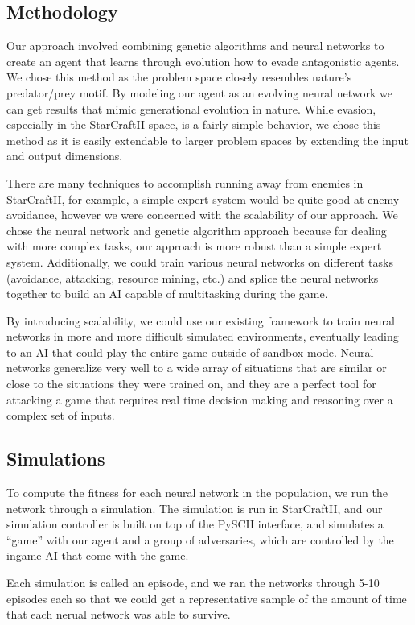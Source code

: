\documentclass{article}
\begin{document}
\begin{multicols}{2}
\section{Methodology}
Our approach involved combining genetic algorithms and neural networks to
create an agent that learns through evolution how to evade antagonistic
agents. We chose this method as the problem space closely resembles nature's
predator/prey motif. By modeling our agent as an evolving neural network we can
get results that mimic generational evolution in nature. While evasion,
especially in the StarCraftII space, is a fairly simple behavior, we chose this
method as it is easily extendable to larger problem spaces by extending the
input and output dimensions.

There are many techniques to accomplish running away from enemies in
StarCraftII, for example, a simple expert system would be quite good at enemy
avoidance, however we were concerned with the scalability of our approach. We
chose the neural network and genetic algorithm approach because for dealing
with more complex tasks, our approach is more robust than a simple expert
system. Additionally, we could train various neural networks on different
tasks (avoidance, attacking, resource mining, etc.) and splice the neural
networks together to build an AI capable of multitasking during the game.

By introducing scalability, we could use our existing framework to train neural
networks in more and more difficult simulated environments, eventually leading
to an AI that could play the entire game outside of sandbox mode. Neural
networks generalize very well to a wide array of situations that are similar or
close to the situations they were trained on, and they are a perfect tool for
attacking a game that requires real time decision making and reasoning over a
complex set of inputs.

\subsection{Simulations}
To compute the fitness for each neural network in the population, we run the
network through a simulation. The simulation is run in StarCraftII, and our
simulation controller is built on top of the PySCII interface, and simulates
a ``game'' with our agent and a group of adversaries, which are controlled by
the ingame AI that come with the game.

Each simulation is called an episode, and we ran the networks through 5-10
episodes each so that we could get a representative sample of the amount of time
that each nerual network was able to survive.


\end{multicols}
\end{document}
